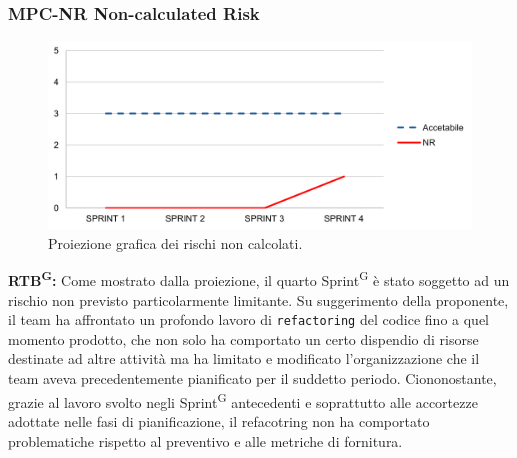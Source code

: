 \documentclass[8pt]{article}
\newcommand{\glossterm}[1]{#1\textsuperscript{G}} %
\begin{document}
\subsubsection{MPC-NR Non-calculated Risk}
\begin{figure}[h!]
    \centering
    \includegraphics[width=1\textwidth]{images/NR.png}
    \caption{Proiezione grafica dei rischi non calcolati.}
    \label{fig:Proiezione grafica dei rischi non calcolati}
\end{figure}
\textbf{\glossterm{RTB}:} Come mostrato dalla proiezione, il quarto \glossterm{Sprint} è stato soggetto ad un rischio non previsto particolarmente limitante. Su suggerimento della proponente, il team ha affrontato un profondo lavoro di \verb|refactoring| del codice fino a quel momento prodotto, che non solo ha comportato un certo dispendio di risorse destinate ad altre attività ma ha limitato e modificato l'organizzazione che il team aveva precedentemente pianificato per il suddetto periodo. Ciononostante, grazie al lavoro svolto negli \glossterm{Sprint} antecedenti e soprattutto alle accortezze adottate nelle fasi di pianificazione, il refacotring non ha comportato problematiche rispetto al preventivo e alle metriche di fornitura.
\end{document}
